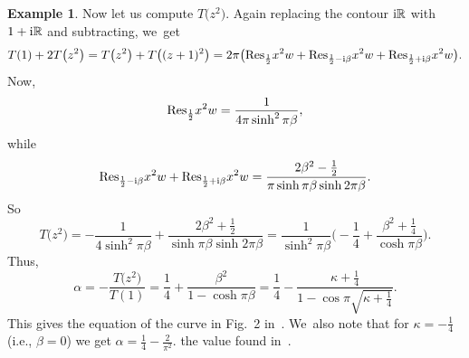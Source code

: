 \documentclass[10pt,a4paper]{amsart}
\theoremstyle{definition}
\newtheorem{Example}[Theorem]{Example}
\numberwithin{equation}{section}
\begin{document}
\begin{Example}
Now let us compute $T\big(z^2\big)$.
Again replacing the contour ${\rm i}\mathbb R$ with $1+{\rm i}\mathbb R$ and subtracting,
we~get
\[
T(1)+2T\big(z^2\big)=T\big(z^2\big)+T\big((z+1)^2\big)=2\pi\big({\rm Res}_{\frac{1}{2}}x^2w+{\rm Res}_{\frac{1}{2}-{\rm i}\beta }x^2w+{\rm Res}_{\frac{1}{2}+{\rm i}\beta }x^2w\big).
\]
Now,
\[
{\rm Res}_{\frac{1}{2}}x^2w=\frac{1}{4\pi\sinh^2\pi \beta},
\]
while
\[
{\rm Res}_{\frac{1}{2}-{\rm i}\beta }x^2w+{\rm Res}_{\frac{1}{2}+{\rm i}\beta }x^2w=\frac{2\beta^2-\frac{1}{2}}{\pi \sinh \pi\beta \sinh 2\pi \beta}.
\]
So
\[
T\big(z^2\big)=-\frac{1}{4\sinh^2\pi \beta}+\frac{2\beta^2+\frac{1}{2}}{\sinh \pi\beta \sinh 2\pi \beta}=
\frac{1}{\sinh^2\pi \beta}\bigg(-\frac{1}{4}+\frac{\beta^2+\frac{1}{4}}{\cosh \pi \beta}\bigg).
\]
Thus,
\[
\alpha=-\frac{T\big(z^2\big)}{T(1)}=\frac{1}{4}+\frac{\beta^2}{1-\cosh \pi\beta }=\frac{1}{4}-\frac{\kappa+\tfrac{1}{4}}{1-\cos\pi\sqrt{\kappa+\tfrac{1}{4}}}.
\]
This gives the equation of the curve in Fig.~2 in~\cite{BPR}. We~also note that for $\kappa=-\frac{1}{4}$ (i.e., $\beta=0$) we get
$\alpha=\frac{1}{4}-\frac{2}{\pi^2}$.
the value found in~\cite{BPR}.
\end{Example}
\end{document}
